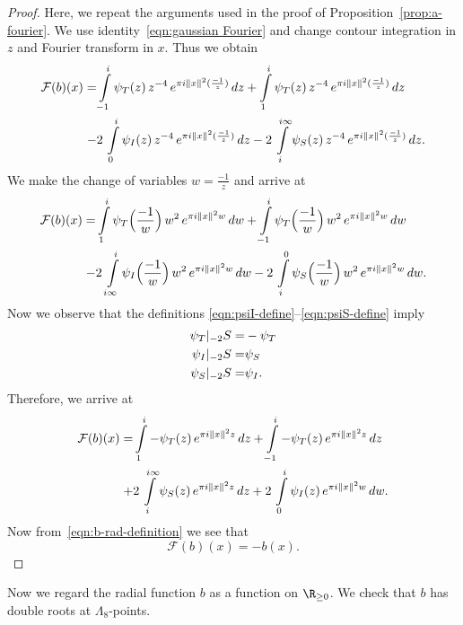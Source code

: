 \begin{proof}\leanok
Here, we repeat the arguments used in the proof of Proposition~\ref{prop:a-fourier}.
We use identity~\eqref{eqn:gaussian Fourier} and change contour integration in $z$ and Fourier transform in $x$. Thus we obtain
\begin{align}
    \mathcal{F}(b)(x)= & \int\limits_{-1}^{i}\psi_T(z)\,z^{-4}\,e^{\pi i \|x\|^2 (\frac{-1}{z})}\,dz
        + \int\limits_{1}^{i}\psi_T(z)\,z^{-4}\,e^{\pi i \|x\|^2 (\frac{-1}{z})}\,dz \notag \\
    -& 2\,\int\limits_{0}^{i}\psi_I(z)\,z^{-4}\,e^{\pi i \|x\|^2 (\frac{-1}{z})}\,dz
    - 2\,\int\limits_{i}^{i\infty}\psi_S(z)\,z^{-4}\,e^{\pi i \|x\|^2 (\frac{-1}{z})}\,dz. \notag
\end{align}
We make the change of variables $w=\frac{-1}{z}$ and arrive at
\begin{align}
    \mathcal{F}(b)(x)= & \int\limits_{1}^{i}\psi_T\Big(\frac{-1}{w}\Big)\,w^{2}\,e^{\pi i \|x\|^2 w}\,dw
        + \int\limits_{-1}^{i}\psi_T\Big(\frac{-1}{w}\Big)\,w^{2}\,e^{\pi i \|x\|^2 w}\,dw \notag \\
    -& 2\,\int\limits_{i\infty}^{i}\psi_I\Big(\frac{-1}{w}\Big)\,w^{2}\,e^{\pi i \|x\|^2 w}\,dw
    - 2\,\int\limits_{i}^{0}\psi_S\Big(\frac{-1}{w}\Big)\,w^{2}\,e^{\pi i \|x\|^2 w}\,dw.\notag
\end{align}
Now we observe that the definitions \eqref{eqn:psiI-define}--\eqref{eqn:psiS-define} imply
\begin{align}
    \psi_T|_{-2}S=&-\psi_T \notag \\
    \psi_I|_{-2}S=&\psi_S \notag \\
    \psi_S|_{-2}S=&\psi_I. \notag
\end{align}
Therefore, we arrive at
\begin{align}
    \mathcal{F}(b)(x)= & \int\limits_{1}^{i}-\psi_T(z)\,e^{\pi i \|x\|^2 z}\,dz
        + \int\limits_{-1}^{i}-\psi_T(z)\,e^{\pi i \|x\|^2 z}\,dz \notag \\
    +& 2\,\int\limits_{i}^{i\infty}\psi_S(z)\,e^{\pi i \|x\|^2 z}\,dz
    + 2\,\int\limits_{0}^{i}\psi_I(z)\,e^{\pi i \|x\|^2 w}\,dw.\notag
\end{align}
Now from~\eqref{eqn:b-rad-definition} we see that
$$ \mathcal{F}(b)(x)=-b(x). $$
\end{proof}
Now we regard the radial function $b$ as a function on $\R_{\geq0}$. We check that $b$ has double roots at $\Lambda_8$-points.

